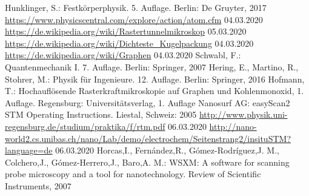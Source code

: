 \begin{thebibliography}{xxx}
        Hunklinger, S.: Festkörperphysik. 5. Auflage. Berlin: De Gruyter, 2017
        \url{https://www.physicscentral.com/explore/action/atom.cfm}
        04.03.2020
        \url{https://de.wikipedia.org/wiki/Rastertunnelmikroskop}
        05.03.2020
        \url{https://de.wikipedia.org/wiki/Dichteste_Kugelpackung}
        04.03.2020
        \url{https://de.wikipedia.org/wiki/Graphen}
        04.03.2020
        Schwabl, F.: Quantenmechanik I. 7. Auflage. Berlin: Springer, 2007
        Hering, E., Martino, R., Stohrer, M.: Physik für Ingenieure. 12. Auflage.
        Berlin: Springer, 2016
        Hofmann, T.: Hochauflösende Rasterkraftmikroskopie auf Graphen und 
        Kohlenmonoxid, 1. Auflage. Regensburg: Universitätsverlag, 1. Auflage
        Nanosurf AG: easyScan2 STM Operating Instructions. Liestal, Schweiz: 2005
        \url{http://www.physik.uni-regensburg.de/studium/praktika/f/rtm.pdf}
        06.03.2020
        \url{http://nano-world2.cs.unibas.ch/nano/Lab/demo/electrochem/Seitenstrang2/insituSTM?language=de}
        06.03.2020
        Horcas,I., Fernández,R., Gómez-Rodríguez,J. M., Colchero,J., 
        Gómez-Herrero,J., Baro,A. M.: WSXM: A software for scanning probe 
        microscopy and a tool for nanotechnology. 
        Review of Scientific Instruments, 2007
\end{thebibliography}
 
